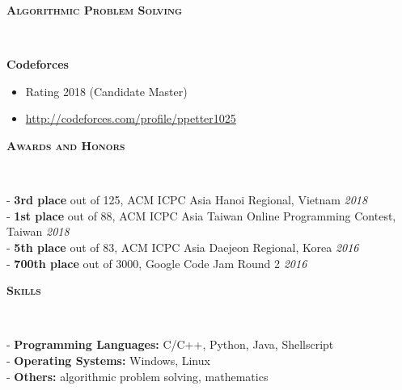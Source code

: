\documentclass[10pt]{article}
\newenvironment{changemargin}[2]{%
  \begin{list}{}{%
    \setlength{\topsep}{0pt}%
    \setlength{\leftmargin}{#1}%
    \setlength{\rightmargin}{#2}%
    \setlength{\listparindent}{\parindent}%
    \setlength{\itemindent}{\parindent}%
    \setlength{\parsep}{\parskip}%
  }%
  \item[]}{\end{list}
}
\newcommand{\lineover}{
	\begin{changemargin}{-0.05in}{-0.05in}
		\vspace*{-8pt}
		\hrulefill \\
		\vspace*{-2pt}
	\end{changemargin}
}
\newcommand{\header}[1]{
	\begin{changemargin}{-0.5in}{-0.5in}
		\large{\bf \scshape{#1}}\\
  	\lineover
	\end{changemargin}
}
\newenvironment{body} {
	\vspace*{-16pt}
	\begin{changemargin}{-0.25in}{-0.5in}
  }	
	{\end{changemargin}
}
\begin{document}
\header{Algorithmic Problem Solving}

\begin{body}

	\vspace{14pt}
	\textbf{Codeforces} \\
    \begin{itemize}[*]
			\item Rating 2018 (Candidate Master)
			\item \href{http://codeforces.com/profile/ppetter1025}{\url{http://codeforces.com/profile/ppetter1025}}
    \end{itemize}
	

\end{body}

\smallskip
\fi

\smallskip


\header{Awards and Honors}

\begin{body}

	\vspace{14pt}
        - \textbf{3rd place} out of 125, ACM ICPC Asia Hanoi Regional, Vietnam \hfill \emph{2018}\\
        - \textbf{1st place} out of 88, ACM ICPC Asia Taiwan Online Programming Contest, Taiwan \hfill \emph{2018}\\
        - \textbf{5th place} out of 83, ACM ICPC Asia Daejeon Regional, Korea \hfill \emph{2016}\\
        - \textbf{700th place} out of 3000, Google Code Jam Round 2 \hfill \emph{2016}\\
	\smallskip		   	
	
\end{body}

\smallskip

\header{Skills}

\begin{body}
	\vspace{14pt}
		- \textbf{Programming Languages:} C/C++, Python, Java, Shellscript \\
		- \textbf{Operating Systems:} Windows, Linux\\
		- \textbf{Others:} algorithmic problem solving, mathematics\\
\end{body}
\end{document}
